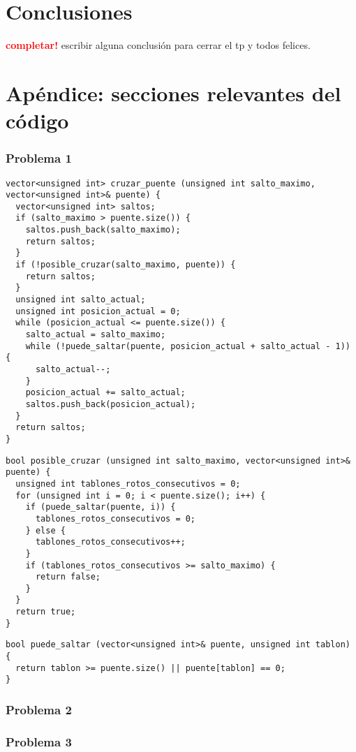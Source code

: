 \documentclass[a4paper]{article}
\begin{document}
\section{Conclusiones}
    \textcolor{red}{\textbf{completar!}} \medskip
    escribir alguna conclusión para cerrar el tp y todos felices.

\newpage

\section{Apéndice: secciones relevantes del código}

\subsubsection{Problema 1}



\begin{lstlisting}
vector<unsigned int> cruzar_puente (unsigned int salto_maximo, vector<unsigned int>& puente) {
  vector<unsigned int> saltos;
  if (salto_maximo > puente.size()) {
    saltos.push_back(salto_maximo);
    return saltos;
  }
  if (!posible_cruzar(salto_maximo, puente)) {
    return saltos;
  }
  unsigned int salto_actual;
  unsigned int posicion_actual = 0;
  while (posicion_actual <= puente.size()) {
    salto_actual = salto_maximo;
    while (!puede_saltar(puente, posicion_actual + salto_actual - 1)) {
      salto_actual--;
    }
    posicion_actual += salto_actual;
    saltos.push_back(posicion_actual);
  }
  return saltos;
}
\end{lstlisting} 

\vspace*{0.5cm}

\begin{lstlisting}
bool posible_cruzar (unsigned int salto_maximo, vector<unsigned int>& puente) {
  unsigned int tablones_rotos_consecutivos = 0;
  for (unsigned int i = 0; i < puente.size(); i++) {
    if (puede_saltar(puente, i)) {
      tablones_rotos_consecutivos = 0;
    } else {
      tablones_rotos_consecutivos++;
    }
    if (tablones_rotos_consecutivos >= salto_maximo) {
      return false;
    }
  }
  return true;
}
\end{lstlisting}

\vspace*{0.5cm}

\begin{lstlisting}
bool puede_saltar (vector<unsigned int>& puente, unsigned int tablon) {
  return tablon >= puente.size() || puente[tablon] == 0;
}
\end{lstlisting}



\subsubsection{Problema 2}



\subsubsection{Problema 3}
\end{document}
